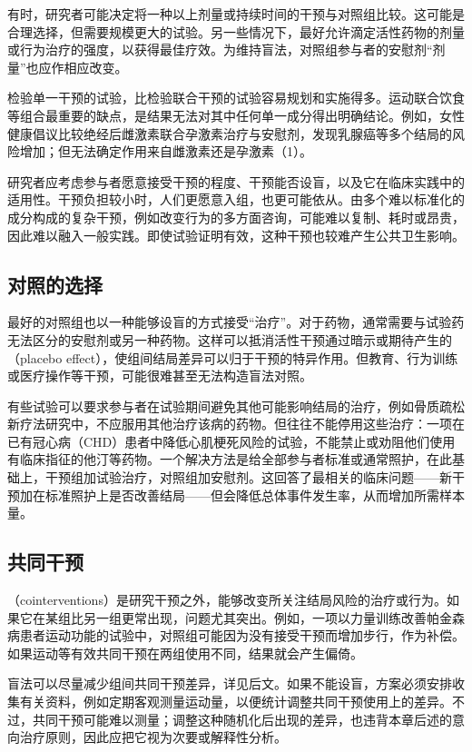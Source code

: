 有时，研究者可能决定将一种以上剂量或持续时间的干预与对照组比较。这可能是合理选择，但需要规模更大的试验。另一些情况下，最好允许滴定活性药物的剂量或行为治疗的强度，以获得最佳疗效。为维持盲法，对照组参与者的安慰剂“剂量”也应作相应改变。

检验单一干预的试验，比检验联合干预的试验容易规划和实施得多。运动联合饮食等组合最重要的缺点，是结果无法对其中任何单一成分得出明确结论。例如，女性健康倡议比较绝经后雌激素联合孕激素治疗与安慰剂，发现乳腺癌等多个结局的风险增加；但无法确定作用来自雌激素还是孕激素（1）。

研究者应考虑参与者愿意接受干预的程度、干预能否设盲，以及它在临床实践中的适用性。干预负担较小时，人们更愿意入组，也更可能依从。由多个难以标准化的成分构成的复杂干预，例如改变行为的多方面咨询，可能难以复制、耗时或昂贵，因此难以融入一般实践。即使试验证明有效，这种干预也较难产生公共卫生影响。

\subsection{对照的选择}
最好的对照组也以一种能够设盲的方式接受“治疗”。对于药物，通常需要与试验药无法区分的安慰剂或另一种药物。这样可以抵消活性干预通过暗示或期待产生的（placebo effect），使组间结局差异可以归于干预的特异作用。但教育、行为训练或医疗操作等干预，可能很难甚至无法构造盲法对照。

有些试验可以要求参与者在试验期间避免其他可能影响结局的治疗，例如骨质疏松新疗法研究中，不应服用其他治疗该病的药物。但往往不能停用这些治疗：一项在已有冠心病（CHD）患者中降低心肌梗死风险的试验，不能禁止或劝阻他们使用有临床指征的他汀等药物。一个解决方法是给全部参与者标准或通常照护，在此基础上，干预组加试验治疗，对照组加安慰剂。这回答了最相关的临床问题——新干预加在标准照护上是否改善结局——但会降低总体事件发生率，从而增加所需样本量。

\subsection{共同干预}
（cointerventions）是研究干预之外，能够改变所关注结局风险的治疗或行为。如果它在某组比另一组更常出现，问题尤其突出。例如，一项以力量训练改善帕金森病患者运动功能的试验中，对照组可能因为没有接受干预而增加步行，作为补偿。如果运动等有效共同干预在两组使用不同，结果就会产生偏倚。

盲法可以尽量减少组间共同干预差异，详见后文。如果不能设盲，方案必须安排收集有关资料，例如定期客观测量运动量，以便统计调整共同干预使用上的差异。不过，共同干预可能难以测量；调整这种随机化后出现的差异，也违背本章后述的意向治疗原则，因此应把它视为次要或解释性分析。

